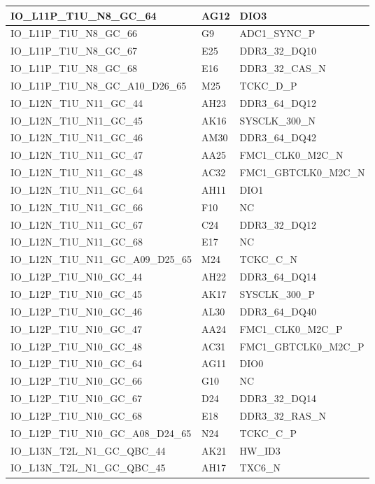 \begin{footnotesize}
\begin{longtable}{|p{7cm}|p{1cm}|p{5cm}|}
IO\_L11P\_T1U\_N8\_GC\_64	&	AG12	&	DIO3	\\ \hline
IO\_L11P\_T1U\_N8\_GC\_66	&	G9	&	ADC1\_SYNC\_P	\\ \hline
IO\_L11P\_T1U\_N8\_GC\_67	&	E25	&	DDR3\_32\_DQ10	\\ \hline
IO\_L11P\_T1U\_N8\_GC\_68	&	E16	&	DDR3\_32\_CAS\_N	\\ \hline
IO\_L11P\_T1U\_N8\_GC\_A10\_D26\_65	&	M25	&	TCKC\_D\_P	\\ \hline
IO\_L12N\_T1U\_N11\_GC\_44	&	AH23	&	DDR3\_64\_DQ12	\\ \hline
IO\_L12N\_T1U\_N11\_GC\_45	&	AK16	&	SYSCLK\_300\_N	\\ \hline
IO\_L12N\_T1U\_N11\_GC\_46	&	AM30	&	DDR3\_64\_DQ42	\\ \hline
IO\_L12N\_T1U\_N11\_GC\_47	&	AA25	&	FMC1\_CLK0\_M2C\_N	\\ \hline
IO\_L12N\_T1U\_N11\_GC\_48	&	AC32	&	FMC1\_GBTCLK0\_M2C\_N	\\ \hline
IO\_L12N\_T1U\_N11\_GC\_64	&	AH11	&	DIO1	\\ \hline
IO\_L12N\_T1U\_N11\_GC\_66	&	F10	&	NC	\\ \hline
IO\_L12N\_T1U\_N11\_GC\_67	&	C24	&	DDR3\_32\_DQ12	\\ \hline
IO\_L12N\_T1U\_N11\_GC\_68	&	E17	&	NC	\\ \hline
IO\_L12N\_T1U\_N11\_GC\_A09\_D25\_65	&	M24	&	TCKC\_C\_N	\\ \hline
IO\_L12P\_T1U\_N10\_GC\_44	&	AH22	&	DDR3\_64\_DQ14	\\ \hline
IO\_L12P\_T1U\_N10\_GC\_45	&	AK17	&	SYSCLK\_300\_P	\\ \hline
IO\_L12P\_T1U\_N10\_GC\_46	&	AL30	&	DDR3\_64\_DQ40	\\ \hline
IO\_L12P\_T1U\_N10\_GC\_47	&	AA24	&	FMC1\_CLK0\_M2C\_P	\\ \hline
IO\_L12P\_T1U\_N10\_GC\_48	&	AC31	&	FMC1\_GBTCLK0\_M2C\_P	\\ \hline
IO\_L12P\_T1U\_N10\_GC\_64	&	AG11	&	DIO0	\\ \hline
IO\_L12P\_T1U\_N10\_GC\_66	&	G10	&	NC	\\ \hline
IO\_L12P\_T1U\_N10\_GC\_67	&	D24	&	DDR3\_32\_DQ14	\\ \hline
IO\_L12P\_T1U\_N10\_GC\_68	&	E18	&	DDR3\_32\_RAS\_N	\\ \hline
IO\_L12P\_T1U\_N10\_GC\_A08\_D24\_65	&	N24	&	TCKC\_C\_P	\\ \hline
IO\_L13N\_T2L\_N1\_GC\_QBC\_44	&	AK21	&	HW\_ID3	\\ \hline
IO\_L13N\_T2L\_N1\_GC\_QBC\_45	&	AH17	&	TXC6\_N	\\ \hline

\end{longtable}
\end{footnotesize}
